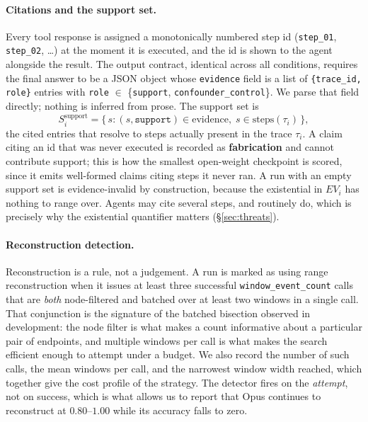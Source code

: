 \documentclass[sigconf,anonymous,review]{acmart}
\begin{document}
\paragraph{Citations and the support set.}
Every tool response is assigned a monotonically numbered step id (\texttt{step\_01},
\texttt{step\_02}, \dots) at the moment it is executed, and the id is shown to the agent alongside
the result. The output contract, identical across all conditions, requires the final answer to be
a JSON object whose \texttt{evidence} field is a list of \texttt{\{trace\_id, role\}} entries with
\texttt{role} $\in$ \{\texttt{support}, \texttt{confounder\_control}\}. We parse that field
directly; nothing is inferred from prose. The support set is
\[
S_i^{\text{support}}=\{\,s : (s,\texttt{support})\in \text{evidence},\; s\in \text{steps}(\tau_i)\,\},
\]
the cited entries that resolve to steps actually present in the trace $\tau_i$. A claim citing an
id that was never executed is recorded as \textbf{fabrication} and cannot contribute support; this
is how the smallest open-weight checkpoint is scored, since it emits well-formed claims citing
steps it never ran. A run with an empty support set is evidence-invalid by construction, because
the existential in $EV_i$ has nothing to range over. Agents may cite several steps, and routinely
do, which is precisely why the existential quantifier matters (\S\ref{sec:threats}).

\paragraph{Reconstruction detection.}
Reconstruction is a rule, not a judgement. A run is marked as using range reconstruction when it
issues at least three successful \texttt{window\_event\_count} calls that are \emph{both}
node-filtered and batched over at least two windows in a single call. That conjunction is the
signature of the batched bisection observed in development: the node filter is what makes a count
informative about a particular pair of endpoints, and multiple windows per call is what makes the
search efficient enough to attempt under a budget. We also record the number of such calls, the
mean windows per call, and the narrowest window width reached, which together give the cost profile
of the strategy. The detector fires on the \emph{attempt}, not on success, which is what allows us
to report that Opus continues to reconstruct at $0.80$--$1.00$ while its accuracy falls to zero.
\end{document}
